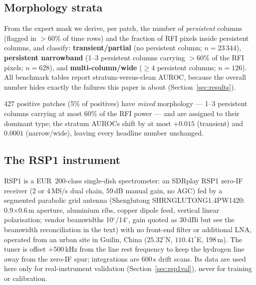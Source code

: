\documentclass[journal]{IEEEtran}
\begin{document}
\subsection{Morphology strata}
From the expert mask we derive, per patch, the number of \emph{persistent}
columns (flagged in $>60\%$ of time rows) and the fraction of RFI pixels
inside persistent columns, and classify: \textbf{transient/partial}
(no persistent column; $n=23\,344$), \textbf{persistent narrowband}
(1--3 persistent columns carrying $>60\%$ of the RFI pixels; $n=628$), and
\textbf{multi-column/wide} ($\ge4$ persistent columns; $n=126$).  All
benchmark tables report stratum-versus-clean AUROC, because the overall
number hides exactly the failures this paper is about
(Section~\ref{sec:results}).


427 positive patches (5\% of positives) have \emph{mixed} morphology --- 1--3 persistent columns carrying at most 60\% of the RFI power --- and are assigned to their dominant type; the stratum AUROCs shift by at most $+0.015$ (transient) and $0.0001$ (narrow/wide), leaving every headline number unchanged.
\subsection{The RSP1 instrument}
RSP1 is a EUR~200-class single-dish spectrometer: an SDRplay RSP1
zero-IF receiver (2 or 4\,MS/s dual chain, 59\,dB manual gain, no AGC)
fed by a segmented parabolic grid antenna (Shenglutong SHRNGLUTONG1.4PW1420: 0.9$\times$0.6\,m aperture, aluminium ribs, copper dipole feed, vertical linear polarisation; vendor beamwidths 10$^\circ$/14$^\circ$, gain quoted as 30\,dBi but see the beamwidth reconciliation in the text) with no
front-end filter or additional LNA, operated from an urban site in Guilin,
China ($25.32^\circ$N, $110.41^\circ$E, 198\,m).  The tuner is offset
$+500$\,kHz from the line rest frequency to keep the hydrogen line away from
the zero-IF spur; integrations are 600\,s drift scans.  Its data are used
here only for real-instrument validation (Section~\ref{sec:rsp1val}), never
for training or calibration.
\end{document}
